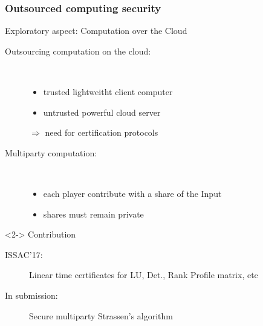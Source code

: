 \documentclass{beamer}
\begin{document}
\begin{frame}
  \frametitle{Outsourced computing security}

  \begin{block}{Exploratory aspect: Computation over the Cloud}
    \begin{description}
    \item[Outsourcing computation on the cloud:]\ 
      \begin{itemize}
      \item trusted lightweitht client computer
      \item untrusted powerful cloud server
      \end{itemize}
      $\Rightarrow$ need for certification protocols
    \item[Multiparty computation:] \
      \begin{itemize}
      \item each player contribute with a share of the Input
      \item shares must remain private
      \end{itemize}
    \end{description}
\end{block}
  \begin{block}<2->
      {Contribution}
      \begin{description}
        \item[ISSAC'17:] Linear time certificates for LU, Det., Rank Profile  matrix, etc
        \item[In submission:] Secure multiparty Strassen's algorithm
      \end{description}
  \end{block}

\end{frame}
\end{document}

